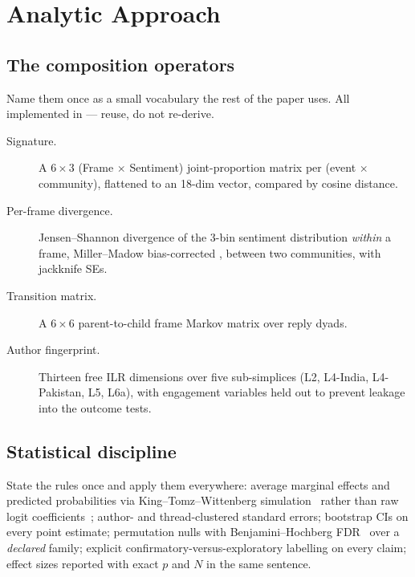 \section{Analytic Approach}

\subsection{The composition operators}

Name them once as a small vocabulary the rest of the paper uses. All implemented
in  --- reuse, do not re-derive.

\begin{description}
\item[Signature.] A $6 \times 3$ (Frame $\times$ Sentiment) joint-proportion
  matrix per (event $\times$ community), flattened to an 18-dim vector, compared
  by cosine distance.
\item[Per-frame divergence.] Jensen--Shannon divergence of the 3-bin sentiment
  distribution \emph{within} a frame, Miller--Madow bias-corrected
  \cite{miller1955note,paninski2003entropy}, between two communities, with
  jackknife SEs.
\item[Transition matrix.] A $6 \times 6$ parent-to-child frame Markov matrix
  over reply dyads.
\item[Author fingerprint.] Thirteen free ILR dimensions
  \cite{aitchison1982compositional,egozcue2003ilr} over five sub-simplices (L2,
  L4-India, L4-Pakistan, L5, L6a), with engagement variables held out to prevent
  leakage into the outcome tests.
\end{description}

\subsection{Statistical discipline}

State the rules once and apply them everywhere: average marginal effects and
predicted probabilities via King--Tomz--Wittenberg
simulation~\cite{king2000interpretation} rather than raw logit
coefficients~\cite{mood2010logistic}; author- and thread-clustered standard
errors; bootstrap CIs on every point estimate; permutation nulls with
Benjamini--Hochberg FDR~\cite{benjamini1995fdr} over a \emph{declared} family;
explicit confirmatory-versus-exploratory labelling on every claim; effect sizes
reported with exact $p$ and $N$ in the same sentence.

